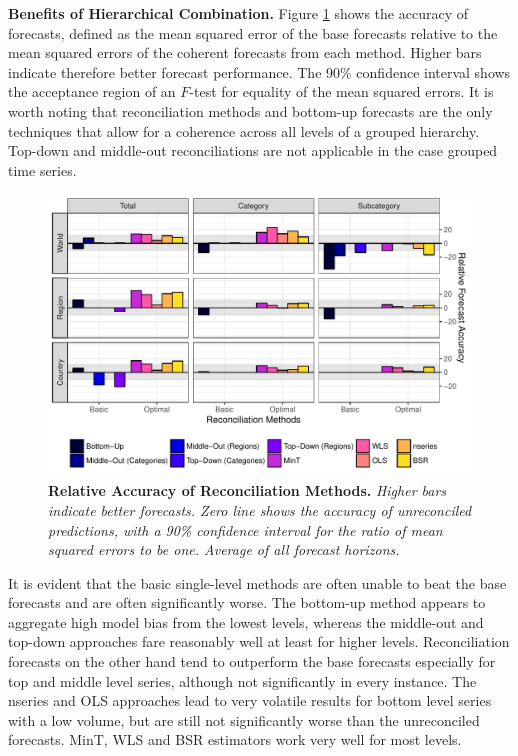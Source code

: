 \documentclass[a4paper,fleqn,11pt]{article}
\begin{document}
\noindent\textbf{Benefits of Hierarchical Combination.} Figure \ref{fig:rmse} shows the accuracy of forecasts, defined as the mean squared error of the base forecasts relative to the mean squared errors of the coherent forecasts from each method. Higher bars indicate therefore better forecast performance. The 90\% confidence interval shows the acceptance region of an $F$-test for equality of the mean squared errors. It is worth noting that reconciliation methods and bottom-up forecasts are the only techniques that allow for a coherence across all levels of a grouped hierarchy. Top-down and middle-out reconciliations are not applicable in the case grouped time series.\\
\begin{figure}[H]
	\includegraphics[width=\textwidth]{fig/fig_eval_rmse_relative}
	\caption[Relative Accuracy of Reconciliation Methods]{\textbf{Relative Accuracy of Reconciliation Methods.} \textit{Higher bars indicate better forecasts. Zero line shows the accuracy of unreconciled predictions, with a 90\% confidence interval for the ratio of mean squared errors to be one. Average of all forecast horizons.}} \label{fig:rmse}
\end{figure}

It is evident that the basic single-level methods are often unable to beat the base forecasts and are often significantly worse. The bottom-up method appears to aggregate high model bias from the lowest levels, whereas the middle-out and top-down approaches fare reasonably well at least for higher levels. Reconciliation forecasts on the other hand tend to outperform the base forecasts especially for top and middle level series, although not significantly in every instance. The nseries and OLS approaches lead to very volatile results for bottom level series with a low volume, but are still not significantly worse than the unreconciled forecasts. MinT, WLS and BSR estimators work very well for most levels. 
\end{document}
